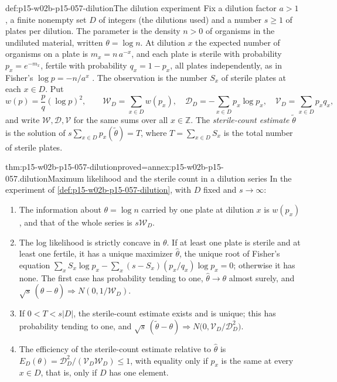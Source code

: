\begin{hbdefinition}{def:p15-w02b-p15-057-dilution}{The dilution experiment}
Fix a dilution factor \(a>1\), a finite nonempty set \(D\) of integers (the
dilutions used) and a number \(s\geq1\) of plates per dilution. The
parameter is the density \(n>0\) of organisms in the undiluted material,
written \(\theta=\log n\). At dilution \(x\) the expected number of
organisms on a plate is \(m_x=n\,a^{-x}\), and each plate is sterile with
probability \(p_x=e^{-m_x}\), fertile with probability \(q_x=1-p_x\), all
plates independently, as in Fisher's
\(\log p=-n/a^x\) \cite[p.~364]{Fisher1922Foundations}. The observation is
the number \(S_x\) of sterile plates at each \(x\in D\). Put
\[
 w(p)=\frac{p}{q}(\log p)^2,\qquad
 \mathcal W_D=\sum_{x\in D}w(p_x),\quad
 \mathcal D_D=-\sum_{x\in D}p_x\log p_x,\quad
 \mathcal V_D=\sum_{x\in D}p_xq_x,
\]
and write \(\mathcal W,\mathcal D,\mathcal V\) for the same sums over all
\(x\in\mathbb Z\). The \emph{sterile-count estimate} \(\widetilde\theta\)
is the solution of \(s\sum_{x\in D}p_x(\widetilde\theta)=T\), where
\(T=\sum_{x\in D}S_x\) is the total number of sterile plates.
\end{hbdefinition}

\begin{hbtheorem}{thm:p15-w02b-p15-057-dilution}{proved=annex:p15-w02b-p15-057.dilution}{Maximum likelihood and the sterile count in a dilution series}
In the experiment of \cref{def:p15-w02b-p15-057-dilution}, with \(D\)
fixed and \(s\to\infty\):
\begin{enumerate}
\item The information about \(\theta=\log n\) carried by one plate at
 dilution \(x\) is \(w(p_x)\), and that of the whole series is
 \(s\mathcal W_D\).
\item The log likelihood is strictly concave in \(\theta\). If at least one
 plate is sterile and at least one fertile, it has a unique maximizer
 \(\widehat\theta\), the unique root of Fisher's equation
 \(\sum_xS_x\log p_x-\sum_x(s-S_x)(p_x/q_x)\log p_x=0\); otherwise it
 has none. The first case has probability tending to one,
 \(\widehat\theta\to\theta\) almost surely, and
 \(\sqrt s\,(\widehat\theta-\theta)\Rightarrow N(0,1/\mathcal W_D)\).
\item If \(0<T<s|D|\), the sterile-count estimate exists and is unique;
 this has probability tending to one, and
 \(\sqrt s\,(\widetilde\theta-\theta)\Rightarrow
 N\bigl(0,\mathcal V_D/\mathcal D_D^2\bigr)\).
\item The efficiency of the sterile-count estimate relative to
 \(\widehat\theta\) is
 \(E_D(\theta)=\mathcal D_D^2/(\mathcal V_D\mathcal W_D)\leq1\), with
 equality only if \(p_x\) is the same at every \(x\in D\), that is, only
 if \(D\) has one element.
\end{enumerate}
\end{hbtheorem}

